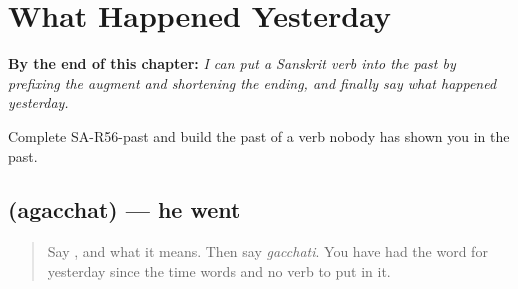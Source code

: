 
\chapter{What Happened Yesterday}
\label{ch:sa-what-happened-yesterday}

\begin{chapteropening}
\textbf{By the end of this chapter:} \emph{I can put a Sanskrit verb into the past by prefixing the augment and shortening the ending, and finally say what happened yesterday.}

Complete SA-R56-past and build the past of a verb nobody has shown you in the past.
\end{chapteropening}

\section[\texorpdfstring{\sk{अगच्छत्} (agacchat)}{अगच्छत् (agacchat)}]{ (agacchat) — he went}

\label{lesson:SA-C56-agacchat}



\begin{quote}
Say \textbf{}, and what it means. Then say \emph{gacchati}. You have had the word for yesterday since the time words and no verb to put in it.
\end{quote}

